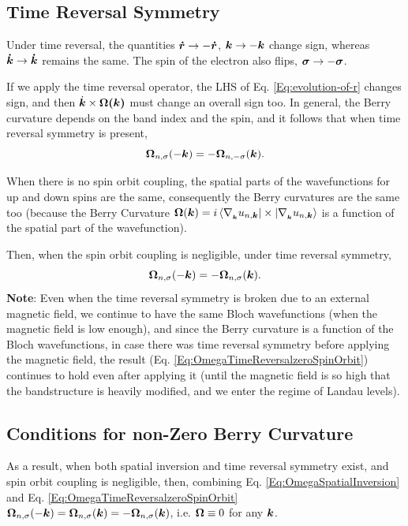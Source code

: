 \documentclass{report}
\renewcommand\vec[1]{\ensuremath\boldsymbol{#1}} %
\begin{document}
\subsection{Time Reversal Symmetry}
Under time reversal, the quantities $\vec{\dot{r}} \rightarrow -\vec{\dot{r}}$, $\vec{k} \rightarrow -\vec{k}$ change sign, whereas $\vec{\dot{k}} \rightarrow \vec{\dot{k}}$ remains the same. The spin of the electron also flips, $\vec{\sigma} \rightarrow -\vec{\sigma}$.

If we apply the time reversal operator, the LHS of Eq. \eqref{Eq:evolution-of-r} changes sign, and then $\dot{\vec{k}}\times \vec{\Omega(\vec{k})}$ must change an overall sign too. In general, the Berry curvature depends on the band index and the spin, and it follows that when time reversal symmetry is present,
\begin{equation}\label{Eq:OmegaTimeReversal}
	\vec{\Omega}_{n,\sigma}(-\vec{k}) = -\vec{\Omega}_{n,-\sigma}(\vec{k}).
\end{equation}

When there is no spin orbit coupling, the spatial parts of the wavefunctions for up and down spins are the same, consequently the Berry curvatures are the same too (because the Berry Curvature $\vec{\Omega}(\vec{k}) = i \bra{\nabla_{_{\vec{k}}} u_{n,\vec{k}}}\times \ket{\nabla_{_{\vec{k}}} u_{n,\vec{k}}}$ is a function of the spatial part of the wavefunction).

Then, when the spin orbit coupling is negligible, under time reversal symmetry,
\begin{equation}\label{Eq:OmegaTimeReversalzeroSpinOrbit}
	\vec{\Omega}_{n,\sigma}(-\vec{k}) = -\vec{\Omega}_{n,\sigma}(\vec{k}).
\end{equation}
\textbf{Note}: Even when the time reversal symmetry is broken due to an external magnetic field, we continue to have the same Bloch wavefunctions (when the magnetic field is low enough), and since the Berry curvature is a function of the Bloch wavefunctions, in case there was time reversal symmetry before applying the magnetic field, the result (Eq. \eqref{Eq:OmegaTimeReversalzeroSpinOrbit}) continues to hold even after applying it (until the magnetic field is so high that the bandstructure is heavily modified, and we enter the regime of Landau levels).

\subsection{Conditions for non-Zero Berry Curvature}
As a result, when both spatial inversion and time reversal symmetry exist, and spin orbit coupling is negligible, then, combining Eq. \eqref{Eq:OmegaSpatialInversion} and Eq. \eqref{Eq:OmegaTimeReversalzeroSpinOrbit} $\vec{\Omega}_{n,\sigma}(-\vec{k}) = \vec{\Omega}_{n,\sigma}(\vec{k}) = -\vec{\Omega}_{n,\sigma}(\vec{k})$, i.e. $\vec{\Omega} \equiv 0$ for any $\vec{k}$.
\end{document}
